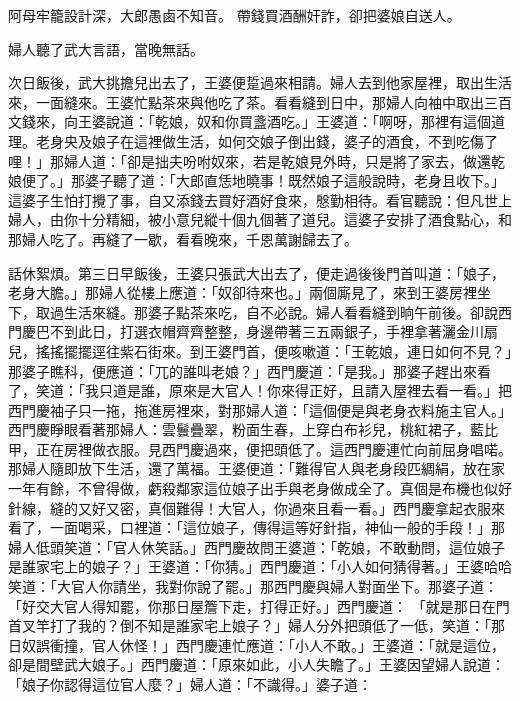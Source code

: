 \begin{showcontents}{}
阿母牢籠設計深，大郎愚鹵不知音。
帶錢買酒酬奸詐，卻把婆娘自送人。

婦人聽了武大言語，當晚無話。

次日飯後，武大挑擔兒出去了，王婆便踅過來相請。婦人去到他家屋裡，取出生活來，一面縫來。王婆忙點茶來與他吃了茶。看看縫到日中，那婦人向袖中取出三百文錢來，向王婆說道：「乾娘，奴和你買盞酒吃。」王婆道：「啊呀，那裡有這個道理。老身央及娘子在這裡做生活，如何交娘子倒出錢，婆子的酒食，不到吃傷了哩！」那婦人道：「卻是拙夫吩咐奴來，若是乾娘見外時，只是將了家去，做還乾娘便了。」那婆子聽了道：「大郎直恁地曉事！既然娘子這般說時，老身且收下。」這婆子生怕打攪了事，自又添錢去買好酒好食來，慇勤相待。看官聽說：但凡世上婦人，由你十分精細，被小意兒縱十個九個著了道兒。這婆子安排了酒食點心，和那婦人吃了。再縫了一歇，看看晚來，千恩萬謝歸去了。

話休絮煩。第三日早飯後，王婆只張武大出去了，便走過後後門首叫道：「娘子，老身大膽。」那婦人從樓上應道：「奴卻待來也。」兩個廝見了，來到王婆房裡坐下，取過生活來縫。那婆子點茶來吃，自不必說。婦人看看縫到晌午前後。卻說西門慶巴不到此日，打選衣帽齊齊整整，身邊帶著三五兩銀子，手裡拿著灑金川扇兒，搖搖擺擺逕往紫石街來。到王婆門首，便咳嗽道：「王乾娘，連日如何不見？」那婆子瞧科，便應道：「兀的誰叫老娘？」西門慶道：「是我。」那婆子趕出來看了，笑道：「我只道是誰，原來是大官人！你來得正好，且請入屋裡去看一看。」把西門慶袖子只一拖，拖進房裡來，對那婦人道：「這個便是與老身衣料施主官人。」西門慶睜眼看著那婦人：雲鬟疊翠，粉面生春，上穿白布衫兒，桃紅裙子，藍比甲，正在房裡做衣服。見西門慶過來，便把頭低了。這西門慶連忙向前屈身唱喏。那婦人隨即放下生活，還了萬福。王婆便道：「難得官人與老身段匹綢絹，放在家一年有餘，不曾得做，虧殺鄰家這位娘子出手與老身做成全了。真個是布機也似好針線，縫的又好又密，真個難得！大官人，你過來且看一看。」西門慶拿起衣服來看了，一面喝采，口裡道：「這位娘子，傳得這等好針指，神仙一般的手段！」那婦人低頭笑道：「官人休笑話。」西門慶故問王婆道：「乾娘，不敢動問，這位娘子是誰家宅上的娘子？」王婆道：「你猜。」西門慶道：「小人如何猜得著。」王婆哈哈笑道：「大官人你請坐，我對你說了罷。」那西門慶與婦人對面坐下。那婆子道：「好交大官人得知罷，你那日屋簷下走，打得正好。」西門慶道： 「就是那日在門首叉竿打了我的？倒不知是誰家宅上娘子？」婦人分外把頭低了一低，笑道：「那日奴誤衝撞，官人休怪！」西門慶連忙應道：「小人不敢。」王婆道：「就是這位，卻是間壁武大娘子。」西門慶道：「原來如此，小人失瞻了。」王婆因望婦人說道：「娘子你認得這位官人麼？」婦人道：「不識得。」婆子道： 
\end{showcontents}
